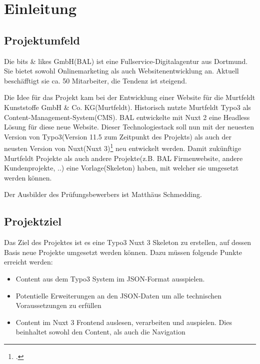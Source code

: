\section{Einleitung}
\label{sec:Einleitung}


\subsection{Projektumfeld} 
\label{sec:Projektumfeld}
Die bits \& likes GmbH(\acs{BAL}) ist eine Fullservice-Digitalagentur aus Dortmund. Sie bietet sowohl Onlinemarketing als auch Websitenentwicklung an. Aktuell beschäfftigt sie ca. 50 Mitarbeiter, die Tendenz ist steigend.

Die Idee für das Projekt kam bei der Entwicklung einer Website für die Murtfeldt Kunststoffe GmbH \& Co. KG(Murtfeldt). Historisch nutzte Murtfeldt Typo3 als Content-Management-System(\acs{CMS}). \acs{BAL} entwickelte mit Nuxt 2 eine Headless Lösung für diese neue Website. Dieser Technologiestack soll nun mit der neuesten Version von Typo3(Version 11.5 zum Zeitpunkt des Projekts) als auch der neusten Version von Nuxt(Nuxt 3)\footnote{\Vgl \citet{Nuxt3}.} neu entwickelt werden. Damit zukünftige Murtfeldt Projekte als auch andere Projekte(z.B. \acs{BAL} Firmenwebsite, andere Kundenprojekte, ..) eine Vorlage(Skeleton) haben, mit welcher sie umgesetzt werden können.

Der Ausbilder des Prüfungsbewerbers ist Matthäus Schmedding.


\subsection{Projektziel} 
\label{sec:Projektziel}
Das Ziel des Projektes ist es eine Typo3 Nuxt 3 Skeleton zu erstellen, auf dessen Basis neue Projekte umgesetzt werden können. Dazu müssen folgende Punkte erreicht werden:
\begin{itemize}
	\item Content aus dem Typo3 System im JSON-Format ausspielen.
	\item Potentielle Erweiterungen an den JSON-Daten um alle technischen Voraussetzungen zu erfüllen
	\item Content im Nuxt 3 Frontend auslesen, verarbeiten und auspielen. Dies beinhaltet sowohl den Content, als auch die Navigation
\end{itemize}

